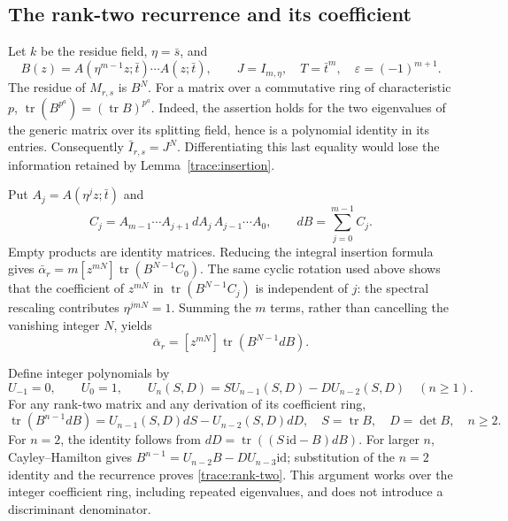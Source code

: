 \subsection{The rank-two recurrence and its coefficient}

Let $k$ be the residue field, $\eta=\bar s$, and
\[
 B(z)=A(\eta^{m-1}z;\bar t)\cdots A(z;\bar t),\qquad
 J=I_{m,\eta},\quad T=\bar t^m,\quad
 \varepsilon=(-1)^{m+1}.
\]
The residue of $M_{r,s}$ is $B^N$. For a matrix over a commutative ring of
characteristic $p$, $\operatorname{tr}(B^{p^a})=(\operatorname{tr}B)^{p^a}$.
Indeed, the assertion holds for the two eigenvalues of the generic matrix
over its splitting field, hence is a polynomial identity in its entries.
Consequently $\bar I_{r,s}=J^N$. Differentiating this last equality would
lose the information retained by Lemma~\ref{trace:insertion}.

Put $A_j=A(\eta^jz;\bar t)$ and
\[
 C_j=A_{m-1}\cdots A_{j+1}\,dA_j\,A_{j-1}\cdots A_0,
 \qquad dB=\sum_{j=0}^{m-1}C_j.
\]
Empty products are identity matrices. Reducing the integral insertion
formula gives
$\bar\alpha_r=m[z^{mN}]\operatorname{tr}(B^{N-1}C_0)$.
The same cyclic rotation used above shows that the coefficient of
$z^{mN}$ in $\operatorname{tr}(B^{N-1}C_j)$ is independent of $j$:
the spectral rescaling contributes $\eta^{jmN}=1$. Summing the $m$
terms, rather than cancelling the vanishing integer $N$, yields
\begin{equation}
 \bar\alpha_r=[z^{mN}]\operatorname{tr}(B^{N-1}dB).
 \label{trace:reduced-insertion}
\end{equation}

Define integer polynomials by
\begin{equation}
 U_{-1}=0,\qquad U_0=1,\qquad
 U_n(S,D)=S U_{n-1}(S,D)-D U_{n-2}(S,D)\quad(n\ge1).
 \label{trace:U}
\end{equation}
For any rank-two matrix and any derivation of its coefficient ring,
\begin{equation}
 \operatorname{tr}(B^{n-1}dB)
 =U_{n-1}(S,D)dS-U_{n-2}(S,D)dD,
 \quad S=\operatorname{tr}B,\quad D=\det B,
 \quad n\ge2.
 \label{trace:rank-two}
\end{equation}
For $n=2$, the identity follows from
$dD=\operatorname{tr}((S\,\mathrm{id}-B)dB)$.
For larger $n$, Cayley--Hamilton gives
$B^{n-1}=U_{n-2}B-DU_{n-3}\mathrm{id}$; substitution of the $n=2$
identity and the recurrence proves \eqref{trace:rank-two}.
This argument works over the integer coefficient ring, including repeated
eigenvalues, and does not introduce a discriminant denominator.

